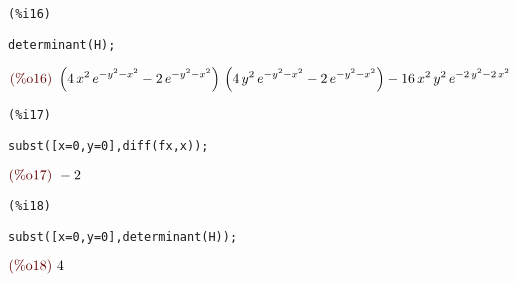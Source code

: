 \documentclass[12pt]{article}
\begin{document}
\noindent
\begin{minipage}[t]{8ex}{\color{red}\bf
\begin{verbatim}
(%i16) 
\end{verbatim}}
\end{minipage}
\begin{minipage}[t]{\textwidth}{\color{blue}
\begin{verbatim}
determinant(H);
\end{verbatim}}
\end{minipage}
\begin{math}\displaystyle
\parbox{8ex}{\color{labelcolor}(\%o16) }
\left( 4\,{x}^{2}\,{e}^{-{y}^{2}-{x}^{2}}-2\,{e}^{-{y}^{2}-{x}^{2}}\right) \,\left( 4\,{y}^{2}\,{e}^{-{y}^{2}-{x}^{2}}-2\,{e}^{-{y}^{2}-{x}^{2}}\right) -16\,{x}^{2}\,{y}^{2}\,{e}^{-2\,{y}^{2}-2\,{x}^{2}}
\end{math}


\noindent
\begin{minipage}[t]{8ex}{\color{red}\bf
\begin{verbatim}
(%i17) 
\end{verbatim}}
\end{minipage}
\begin{minipage}[t]{\textwidth}{\color{blue}
\begin{verbatim}
subst([x=0,y=0],diff(fx,x));
\end{verbatim}}
\end{minipage}
\begin{math}\displaystyle
\parbox{8ex}{\color{labelcolor}(\%o17) }
-2
\end{math}


\noindent
\begin{minipage}[t]{8ex}{\color{red}\bf
\begin{verbatim}
(%i18) 
\end{verbatim}}
\end{minipage}
\begin{minipage}[t]{\textwidth}{\color{blue}
\begin{verbatim}
subst([x=0,y=0],determinant(H));
\end{verbatim}}
\end{minipage}
\begin{math}\displaystyle
\parbox{8ex}{\color{labelcolor}(\%o18) }
4
\end{math}
\end{document}
